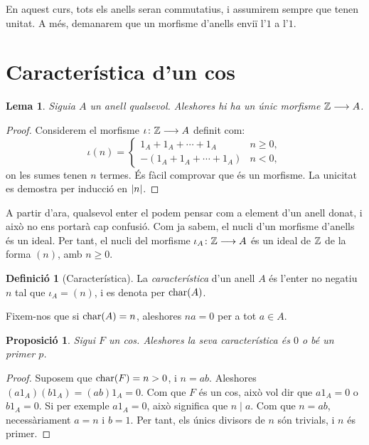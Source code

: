 \documentclass[
]{book}
\newtheorem{lemma}{Lema}[chapter]
\newtheorem{proposition}{Proposició}[chapter]
\theoremstyle{definition}
\newtheorem{definition}{Definició}[chapter]
\theoremstyle{definition}
\theoremstyle{definition}
\theoremstyle{definition}
\theoremstyle{remark}
\begin{document}
En aquest curs, tots els anells seran commutatius, i assumirem sempre que tenen unitat. A més, demanarem
que un morfisme d'anells enviï l'\(1\) a l'\(1\).

\hypertarget{caracteruxedstica-dun-cos}{%
\section{Característica d'un cos}\label{caracteruxedstica-dun-cos}}

\begin{lemma}
Siguia \(A\) un anell qualsevol. Aleshores hi ha un únic morfisme \(\mathbb{Z} \longrightarrow A\).
\end{lemma}

\begin{proof}
Considerem el morfisme \(\iota\colon \mathbb{Z}\longrightarrow A\) definit com:
\[
\iota(n)=\begin{cases}
1_A+1_A+\cdots+1_A & n \geq 0,\\
-(1_A+1_A+\cdots+1_A) & n < 0,
\end{cases}
\]
on les sumes tenen \(n\) termes. És fàcil comprovar que és un morfisme. La unicitat es demostra per inducció en \(|n|\).
\end{proof}

A partir d'ara, qualsevol enter el podem pensar com a element d'un anell donat, i això no ens portarà cap confusió. Com ja sabem, el nucli d'un morfisme d'anells és un ideal. Per tant, el nucli del morfisme \(\iota_A\colon \mathbb{Z}\longrightarrow A\) és un ideal de \(\mathbb{Z}\) de
la forma \((n)\), amb \(n\geq 0\).

\begin{definition}[Característica]
La \emph{característica} d'un anell \(A\) és l'enter no negatiu \(n\) tal que \(\iota_A = (n)\), i es denota per \(\operatorname{char}(A)\).
\end{definition}

Fixem-nos que si \(\operatorname{char}(A)=n\), aleshores \(na = 0\) per a tot \(a\in A\).

\begin{proposition}
\protect\hypertarget{prp:car-primer}{}\label{prp:car-primer}Sigui \(F\) un cos. Aleshores la seva característica és \(0\) o bé un primer \(p\).
\end{proposition}

\begin{proof}
Suposem que \(\operatorname{char}(F)=n>0\), i \(n=ab\). Aleshores \((a1_A)(b1_A)=(ab)1_A=0\). Com que \(F\) és un cos,
això vol dir que \(a1_A=0\) o \(b1_A=0\). Si per exemple \(a1_A=0\), això significa que \(n \mid a\). Com que \(n=ab\),
necessàriament \(a=n\) i \(b=1\). Per tant, els únics divisors de \(n\) són trivials, i \(n\) és primer.
\end{proof}
\end{document}
